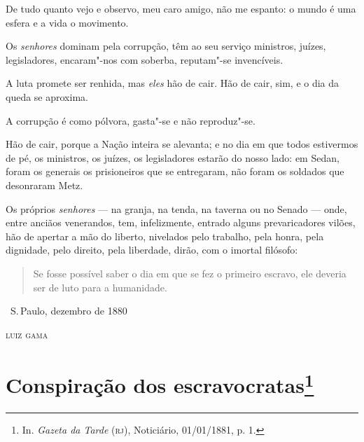 De tudo quanto vejo e observo, meu caro amigo, não me espanto: o mundo é
uma esfera e a vida o movimento.

Os \emph{senhores} dominam pela corrupção, têm ao seu serviço ministros,
juízes, legisladores, encaram"-nos com soberba, reputam"-se invencíveis.

A luta promete ser renhida, mas \emph{eles} hão de cair. Hão de cair,
sim, e o dia da queda se aproxima.

A corrupção é como pólvora, gasta"-se e não reproduz"-se.

Hão de cair, porque a Nação inteira se alevanta; e no dia em que todos
estivermos de pé, os ministros, os juízes, os legisladores estarão do
nosso lado: em Sedan, foram os generais os prisioneiros que se
entregaram, não foram os soldados que desonraram Metz.

Os próprios \emph{senhores} --- na granja, na tenda, na taverna ou no
Senado --- onde, entre anciãos venerandos, tem, infelizmente, entrado
alguns prevaricadores vilões, hão de apertar a mão do liberto, nivelados
pelo trabalho, pela honra, pela dignidade, pelo direito, pela liberdade,
dirão, com o imortal filósofo:

\begin{quote}
Se fosse possível saber o dia em que se fez o primeiro escravo,
ele deveria ser de luto para a humanidade.
\end{quote}

\bigskip

\hfill\ S.\,Paulo, dezembro de 1880\bigskip

\hfill\textsc{luiz gama}

\chapter{Conspiração dos escravocratas\footnote[*]{In. \emph{Gazeta da Tarde}
  (\textsc{rj}), Noticiário, 01/01/1881, p. 1.}}


